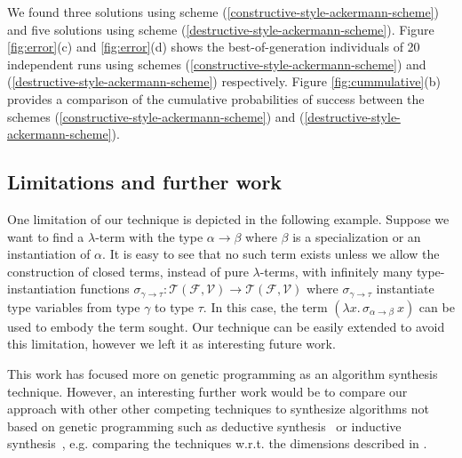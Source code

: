 \cbstart We found three solutions using scheme (\ref{constructive-style-ackermann-scheme}) and five solutions using scheme (\ref{destructive-style-ackermann-scheme}).
Figure \ref{fig:error}(c) and \ref{fig:error}(d) shows the best-of-generation individuals of 20 independent runs using schemes (\ref{constructive-style-ackermann-scheme}) and (\ref{destructive-style-ackermann-scheme}) respectively. Figure \ref{fig:cummulative}(b) provides a comparison of the cumulative probabilities of success between the schemes (\ref{constructive-style-ackermann-scheme}) and (\ref{destructive-style-ackermann-scheme})\cbend. %

\subsection{Limitations and further work}
One limitation of our technique is depicted in the following example. Suppose we want to find a $\lambda$-term with the type $\alpha \to \beta$ where $\beta$ is a specialization or an instantiation of $\alpha$. It is easy to see that no such term exists unless we allow the construction of closed terms, instead of pure $\lambda$-terms, with infinitely many type-instantiation functions $\sigma_{\gamma\to\tau} : \mathcal{T}(\mathcal{F},\mathcal{V}) \to \mathcal{T}(\mathcal{F},\mathcal{V})$ where $\sigma_{\gamma\to\tau}$ instantiate type variables from type $\gamma$ to type $\tau$. In this case, the term $(\lambda x.\, \sigma_{\alpha\to\beta}\ x)$ can be used to embody the term sought. Our technique can be easily extended to avoid this limitation, however we left it as interesting future work.

This work has focused more on genetic programming as an algorithm synthesis technique. However, an interesting further work would be to compare our approach with other other competing techniques to synthesize algorithms not based on genetic programming such as deductive synthesis~\cite{manna1980deductive} or inductive synthesis~\cite{kitzelmann2006inductive,kitzelmann2009inductive}, e.g. comparing the techniques w.r.t. the dimensions described in \cite{gulwani2010dimensions}.


